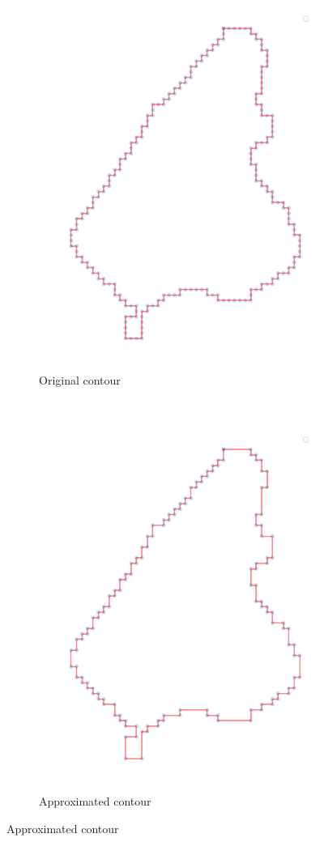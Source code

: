\begin{figure}[H]
    \centering
	\begin{subfigure}{0.45\textwidth}
    	\includegraphics[width=0.9\linewidth]{chapters/challenges/images/original_contour.png}		    	\caption{Original contour}
	\end{subfigure}~
	\begin{subfigure}{0.45\textwidth}
    	\includegraphics[width=0.9\linewidth]{chapters/challenges/images/approx_contour.png}       			\caption{Approximated contour}

\end{subfigure}
\end{figure}
